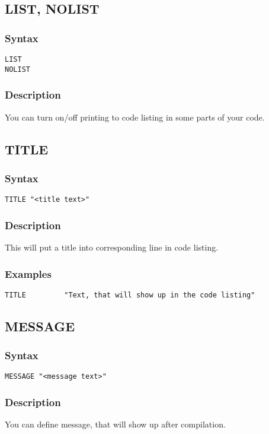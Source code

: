     \subsection{LIST, NOLIST}
        \subsubsection{Syntax}
            \verb'LIST'\\
            \verb'NOLIST'

        \subsubsection{Description}
            You can turn on/off printing to code listing in some parts of your code.

    \subsection{TITLE}
        \subsubsection{Syntax}
            \verb'TITLE "<title text>"'

        \subsubsection{Description}
            This will put a title into corresponding line in code listing.

        \subsubsection{Examples}
            \verb'TITLE         "Text, that will show up in the code listing"'

    \subsection{MESSAGE}
        \subsubsection{Syntax}
            \verb'MESSAGE "<message text>"'

        \subsubsection{Description}
            You can define message, that will show up after compilation.

